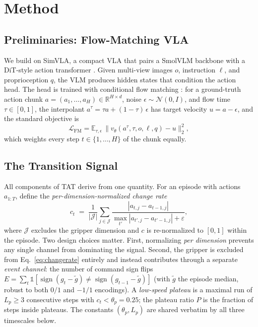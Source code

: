 \documentclass[letterpaper]{article} %
\newcommand{\method}{TAT} %
\begin{document}
\section{Method}

\subsection{Preliminaries: Flow-Matching VLA}
We build on SimVLA, a compact VLA that pairs a SmolVLM backbone \cite{marafioti2025smolvlm} with a DiT-style action transformer \cite{peebles2023dit}. Given multi-view images $o$, instruction $\ell$, and proprioception $q$, the VLM produces hidden states that condition the action head. The head is trained with conditional flow matching \cite{lipman2023flow}: for a ground-truth action chunk $a = (a_1,\dots,a_H) \in \mathbb{R}^{H \times d}$, noise $\epsilon \sim \mathcal{N}(0, I)$, and flow time $\tau \in [0,1]$, the interpolant $a^\tau = \tau a + (1-\tau)\,\epsilon$ has target velocity $u = a - \epsilon$, and the standard objective is
\begin{equation}
\mathcal{L}_{\mathrm{FM}} = \mathbb{E}_{\tau,\epsilon}\, \big\| v_\theta(a^\tau, \tau, o, \ell, q) - u \big\|_2^2 ,
\label{eq:fm}
\end{equation}
which weights every step $t \in \{1,\dots,H\}$ of the chunk equally.

\subsection{The Transition Signal}
\label{sec:signal}
All components of \method{} derive from one quantity. For an episode with actions $a_{1:T}$, define the \emph{per-dimension-normalized change rate}
\begin{equation}
c_t \;=\; \frac{1}{|\mathcal{J}|} \sum_{j \in \mathcal{J}}
\frac{|a_{t,j} - a_{t-1,j}|}{\max_{t'} |a_{t',j} - a_{t'-1,j}| + \varepsilon},
\label{eq:changerate}
\end{equation}
where $\mathcal{J}$ excludes the gripper dimension and $c$ is re-normalized to $[0,1]$ within the episode. Two design choices matter. First, normalizing \emph{per dimension} prevents any single channel from dominating the signal. Second, the gripper is excluded from Eq.~\ref{eq:changerate} entirely and instead contributes through a separate \emph{event channel}: the number of command sign flips $E = \sum_t \mathbb{1}[\operatorname{sign}(g_t - \tilde{g}) \neq \operatorname{sign}(g_{t-1} - \tilde{g})]$ (with $\tilde g$ the episode median, robust to both $0/1$ and $-1/1$ encodings). A \emph{low-speed plateau} is a maximal run of $L_p \geq 3$ consecutive steps with $c_t < \theta_p = 0.25$; the plateau ratio $P$ is the fraction of steps inside plateaus. The constants $(\theta_p, L_p)$ are shared verbatim by all three timescales below.
\end{document}
